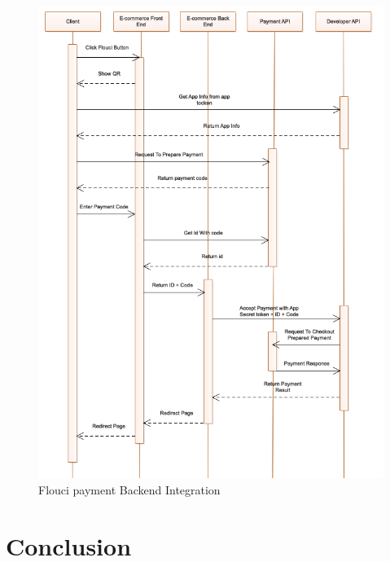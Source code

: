 \begin{spacing}{1.2}
\begin{figure}[H]\centering
\includegraphics[scale=0.6]{Payment_Sequence_Diagram.png}
\caption{Flouci payment Backend Integration}
\label{fig:flask}
\end{figure}
\section*{Conclusion}
\end{spacing}
